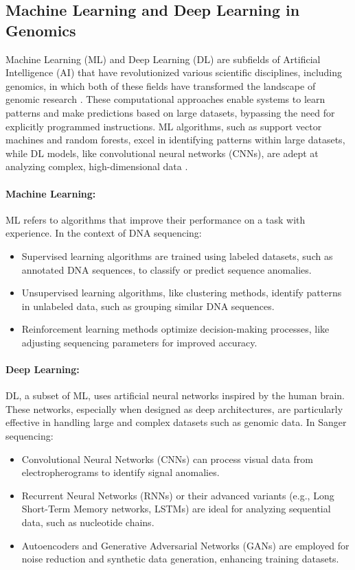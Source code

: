 \subsection{Machine Learning and Deep Learning in Genomics}
Machine Learning (ML) and Deep Learning (DL) are subfields of Artificial Intelligence (AI) that have revolutionized various scientific disciplines, including genomics, in which both of these fields have transformed the landscape of genomic research \cite{ml_genomics_review}. These computational approaches enable systems to learn patterns and make predictions based on large datasets, bypassing the need for explicitly programmed instructions.
ML algorithms, such as support vector machines and random forests, excel in identifying patterns within large datasets, while DL models, like convolutional neural networks (CNNs), are adept at analyzing complex, high-dimensional data \cite{libbrecht_ml_genomics,dl_methods_genomics}.

\paragraph{Machine Learning:}
ML refers to algorithms that improve their performance on a task with experience. In the context of DNA sequencing:
\begin{itemize}
\item Supervised learning algorithms are trained using labeled datasets, such as annotated DNA sequences, to classify or predict sequence anomalies.
\item Unsupervised learning algorithms, like clustering methods, identify patterns in unlabeled data, such as grouping similar DNA sequences.
\item Reinforcement learning methods optimize decision-making processes, like adjusting sequencing parameters for improved accuracy.
\end{itemize}

\paragraph{Deep Learning:}
DL, a subset of ML, uses artificial neural networks inspired by the human brain. These networks, especially when designed as deep architectures, are particularly effective in handling large and complex datasets such as genomic data. In Sanger sequencing:
\begin{itemize}
\item Convolutional Neural Networks (CNNs) can process visual data from electropherograms to identify signal anomalies.
\item Recurrent Neural Networks (RNNs) or their advanced variants (e.g., Long Short-Term Memory networks, LSTMs) are ideal for analyzing sequential data, such as nucleotide chains.
\item Autoencoders and Generative Adversarial Networks (GANs) are employed for noise reduction and synthetic data generation, enhancing training datasets.
\end{itemize}

